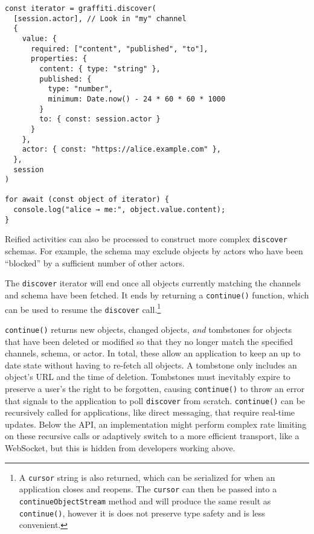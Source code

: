 \begin{verbatim}
const iterator = graffiti.discover(
  [session.actor], // Look in "my" channel
  {
    value: {
      required: ["content", "published", "to"],
      properties: {
        content: { type: "string" },
        published: {
          type: "number",
          minimum: Date.now() - 24 * 60 * 60 * 1000
        }
        to: { const: session.actor }
      }
    },
    actor: { const: "https://alice.example.com" },
  },
  session
)

for await (const object of iterator) {
  console.log("alice → me:", object.value.content);
}
\end{verbatim}

Reified activities can also be processed to construct more
complex \texttt{discover} schemas.
For example, the schema may exclude objects by
actors who have been ``blocked'' by a sufficient
number of other actors.

The \texttt{discover} iterator will end once all objects
currently matching the channels and schema have been fetched.
It ends by returning a
\texttt{continue()} function,
which can be used to resume
the \texttt{discover} call.\footnote{
    A \texttt{cursor} string is also returned, which can be
    serialized for when an application closes and reopens.
    The \texttt{cursor} can then be passed into a \texttt{continueObjectStream}
    method and will produce the same result as \texttt{continue()},
    however it is does not preserve type safety and is less convenient.
}

\texttt{continue()} returns new objects, changed objects, \emph{and}
tombstones for objects that have been deleted or modified so that they no longer match the
specified channels, schema, or actor.
In total, these allow an application to keep an up to date state
without having to re-fetch all objects.
A tombstone only includes an object's URL and the time of deletion.
Tombstones must inevitably expire to preserve a user's the right to be forgotten,
causing \texttt{continue()} to throw an error
that signals to the application to poll \texttt{discover} from scratch.
\texttt{continue()} can be recursively called for applications,
like direct messaging, that require real-time updates.
Below the API, an implementation might perform complex rate limiting on these recursive calls or adaptively switch to a more efficient transport, like a WebSocket, but this is hidden from developers working above.


